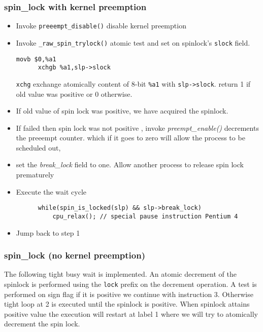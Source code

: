 \documentclass{article}
\begin{document}
  \subsubsection{spin\_lock with kernel preemption}

  \begin{itemize}
  \item Invoke \lstinline{preeempt_disable()} disable kernel preemption
    
  \item Invoke \lstinline{_raw_spin_trylock()} atomic test and set on
    spinlock's \lstinline{slock} field.

      \begin{lstlisting}[language=anX86]
      movb $0,%a1
      xchgb %a1,slp->slock
      \end{lstlisting}


      \lstinline{xchg} exchange atomically content of 8-bit
      \lstinline{%a1} with \lstinline{slp->slock}.  return 1 if old
      value was positive or 0 otherwise.

    \item If old value of spin lock was positive, we have acquired the
      spinlock.
        
    \item If failed then spin lock was not positive , invoke
      \emph{preempt\_enable()} decrements the preeempt counter. which
      if it goes to zero will allow the process to be scheduled out,

    \item set the \emph{break\_lock} field to one. Allow another
      process to release spin lock prematurely

    \item Execute the wait cycle
      \begin{lstlisting}
      while(spin_is_locked(slp) && slp->break_lock)
          cpu_relax(); // special pause instruction Pentium 4
      \end{lstlisting}
    \item Jump back to step 1       
  \end{itemize}


  \subsubsection{spin\_lock (no kernel preemption)}

  The following tight busy wait is implemented. An atomic decrement of
  the spinlock is performed using the \lstinline{lock} prefix on the
  decrement operation. A test is performed on sign flag if it is
  positive we continue with instruction 3. Otherwise tight loop at 2
  is executed until the spinlock is positive. When spinlock attains
  positive value the execution will restart at label 1 where we will
  try to atomically decrement the spin lock.
\end{document}
